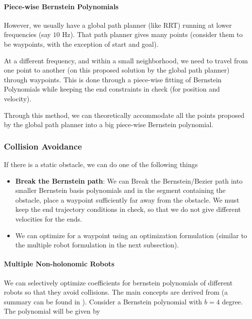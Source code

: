 \paragraph{Piece-wise Bernstein Polynomials}

However, we usually have a global path planner (like RRT) running at lower frequencies (say $10$ Hz). That path planner gives many points (consider them to be waypoints, with the exception of start and goal).

At a different frequency, and within a small neighborhood, we need to travel from one point to another (on this proposed solution by the global path planner) through waypoints. This is done through a piece-wise fitting of Bernstein Polynomials while keeping the end constraints in check (for position and velocity).

Through this method, we can theoretically accommodate all the points proposed by the global path planner into a big piece-wise Bernstein polynomial.

\subsubsection{Collision Avoidance}

If there is a static obstacle, we can do one of the following things

\begin{itemize}
    \item \textbf{Break the Bernstein path}: We can Break the Bernstein/Bezier path into smaller Bernstein basis polynomials and in the segment containing the obstacle, place a waypoint sufficiently far away from the obstacle. We must keep the end trajectory conditions in check, so that we do not give different velocities for the ends.
    \item We can optimize for a waypoint using an optimization formulation (similar to the multiple robot formulation in the next subsection).
\end{itemize}

\paragraph{Multiple Non-holonomic Robots}

We can selectively optimize coefficients for bernstein polynomials of different robots so that they avoid collisions. The main concepts are derived from \cite{klanvcar2010case} (a summary can be found in \cite{skrjanc2007cooperative}). Consider a Bernstein polynomial with $b = 4$ degree. The polynomial will be given by

